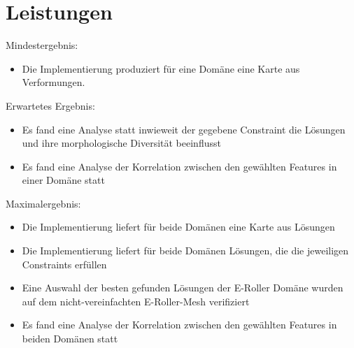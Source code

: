 \documentclass[12pt]{article}
\begin{document}
\section{Leistungen}
Mindestergebnis:
\begin{itemize}  
\item Die Implementierung produziert für eine Domäne eine Karte aus Verformungen.
\end{itemize}
Erwartetes Ergebnis:
\begin{itemize}  
\item Es fand eine Analyse statt inwieweit der gegebene Constraint die Lösungen und ihre morphologische Diversität beeinflusst
\item Es fand eine Analyse der Korrelation zwischen den gewählten Features in einer Domäne statt
\end{itemize}
Maximalergebnis:
\begin{itemize}  
\item Die Implementierung liefert für beide Domänen eine Karte aus Lösungen
\item Die Implementierung liefert für beide Domänen Lösungen, die die jeweiligen Constraints erfüllen
\item Eine Auswahl der besten gefunden Lösungen der E-Roller Domäne wurden auf dem nicht-vereinfachten E-Roller-Mesh verifiziert
\item Es fand eine Analyse der Korrelation zwischen den gewählten Features in beiden Domänen statt
\end{itemize}

\newpage{}

\end{document}
